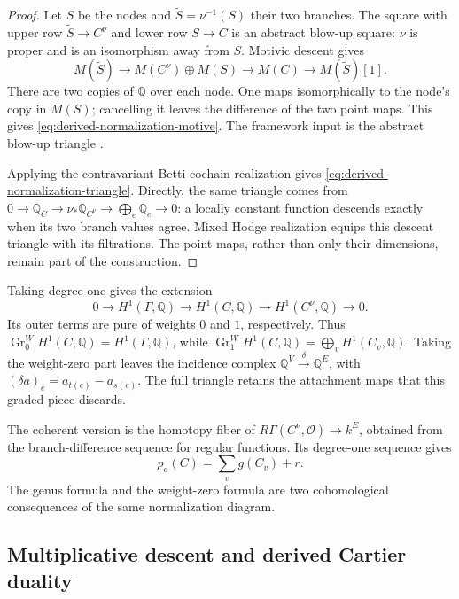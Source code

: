 \documentclass[11pt]{article}
\theoremstyle{definition}
\theoremstyle{remark}
\newcommand{\Q}{\mathbb Q}
\begin{document}
\begin{proof}
Let $S$ be the nodes and $\widetilde S=\nu^{-1}(S)$ their two branches.
The square with upper row $\widetilde S\to C^\nu$ and lower row $S\to C$
is an abstract blow-up square: $\nu$ is proper and is an isomorphism away
from $S$. Motivic descent gives
\[
 M(\widetilde S)\longrightarrow M(C^\nu)\oplus M(S)
 \longrightarrow M(C)\longrightarrow M(\widetilde S)[1].
\]
There are two copies of $\Q$ over each node. One maps isomorphically to
the node's copy in $M(S)$; cancelling it leaves the difference of the two
point maps. This gives \eqref{eq:derived-normalization-motive}. The
framework input is the abstract blow-up triangle
\cite[Proposition 4.1.3]{dagVoevodsky2000}.

Applying the contravariant Betti cochain realization gives
\eqref{eq:derived-normalization-triangle}. Directly, the same triangle
comes from $0\to\Q_C\to\nu_*\Q_{C^\nu}\to\bigoplus_e\Q_e\to0$:
a locally constant function descends exactly when its two branch values
agree. Mixed Hodge realization equips this descent triangle with its
filtrations. The point maps, rather than only their dimensions, remain
part of the construction.
\end{proof}

Taking degree one gives the extension
\begin{equation}\label{eq:nodal-hodge-extension}
 0\longrightarrow H^1(\Gamma,\Q)\longrightarrow H^1(C,\Q)
 \longrightarrow H^1(C^\nu,\Q)\longrightarrow0.
\end{equation}
Its outer terms are pure of weights $0$ and $1$, respectively. Thus
$\operatorname{Gr}^W_0H^1(C,\Q)=H^1(\Gamma,\Q)$, while
$\operatorname{Gr}^W_1H^1(C,\Q)=\bigoplus_vH^1(C_v,\Q)$.
Taking the weight-zero part leaves the incidence complex
$\Q^V\xrightarrow{\delta}\Q^E$, with
$(\delta a)_e=a_{t(e)}-a_{s(e)}$. The full triangle retains the
attachment maps that this graded piece discards.

The coherent version is the homotopy fiber of
$R\Gamma(C^\nu,\mathcal O)\to k^E$, obtained from the branch-difference
sequence for regular functions. Its degree-one sequence gives
\[
 p_a(C)=\sum_v g(C_v)+r.
\]
The genus formula and the weight-zero formula are two cohomological
consequences of the same normalization diagram.

\subsection{Multiplicative descent and derived Cartier duality}
\label{sec:graph-generalized-jacobian}
\end{document}
